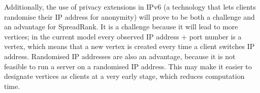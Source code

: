 Additionally, the use of privacy extensions in IPv6 (a technology that lets clients randomise their IP address for anonymity) will prove to be both a challenge and an advantage for SpreadRank.
It is a challenge because it will lead to more vertices; in the current model every observed IP address + port number is a vertex, which means that a new vertex is created every time a client switches IP address.
Randomised IP addresses are also an advantage, because it is not feasible to run a server on a randomised IP address.
This may make it easier to designate vertices as clients at a very early stage, which reduces computation time.

